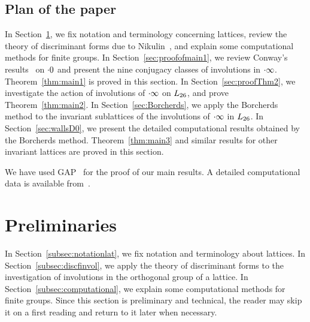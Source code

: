 \documentclass{amsart} %
\begin{document}
\subsection{Plan of the paper}\label{subsec:plan}
%
In Section~\ref{sec:prelim},
we fix notation and terminology concerning lattices, 
review the theory of discriminant forms
due to Nikulin~\cite{MR525944}, 
and explain some computational methods 
for finite groups.
In Section~\ref{sec:proofofmain1},
we review Conway's results~\cite[Chapter 10]{theCSbook} on $\cdot 0$
and present the nine conjugacy classes of involutions in $\cdot \infty$.
Theorem~\ref{thm:main1} is proved in this section.
In Section~\ref{sec:proofThm2},
we investigate the action of involutions of $\cdot \infty$ on $L_{26}$,
and prove Theorem~\ref{thm:main2}.
In Section~\ref{sec:Borcherds},
we apply the Borcherds method to the invariant sublattices of the involutions 
of $\cdot \infty$ in $L_{26}$.
In Section~\ref{sec:wallsD0},
we present the detailed computational results obtained by
 the Borcherds method.
 Theorem~\ref{thm:main3} and similar results for other invariant lattices are proved in this section.
%
\par
We have used GAP~\cite{GAP4} 
for the proof of our main results.
A detailed computational data is available from~\cite{affConwayCompdata}.
%
\section{Preliminaries}\label{sec:prelim}
%
In Section~\ref{subsec:notationlat}, 
we fix notation and terminology about lattices.
In Section~\ref{subsec:discfinvol},
we apply the theory of discriminant forms
to the investigation of involutions in the orthogonal group of a lattice.
In Section~\ref{subsec:computational},
we explain some computational methods 
for finite groups.
Since this section is preliminary and technical, the reader may skip it on a first reading and return to it later when necessary.
%
%
\end{document}

